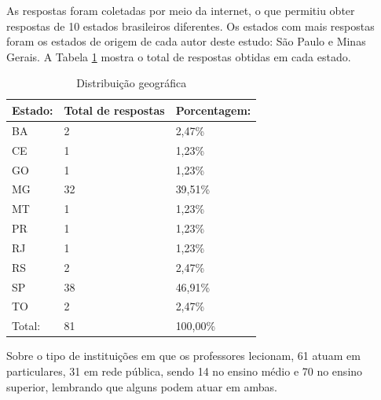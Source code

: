 As respostas foram coletadas por meio da internet, o que permitiu obter respostas de 10 estados brasileiros diferentes. Os estados com mais respostas foram os estados de origem de cada autor deste estudo: São Paulo e Minas Gerais.
A Tabela \ref{tab:distribuicao_geografica} mostra o total de respostas obtidas em cada estado.

\bgroup
\def\arraystretch{1.5} %
\begin{table}[h]{} %
\centering
\caption{Distribuição geográfica}
\begin{tabular}{ | p{3cm} | p{5cm}| p{5cm}| } \hline
\textbf{Estado:} & \textbf{Total de respostas} & \textbf{Porcentagem: } \\ \hline
BA & 2 & 2,47\% \\ \hline
CE & 1 & 1,23\% \\ \hline
GO & 1 & 1,23\% \\ \hline
MG & 32 & 39,51\% \\ \hline
MT & 1 & 1,23\% \\ \hline
PR & 1 & 1,23\% \\ \hline
RJ & 1 & 1,23\% \\ \hline
RS & 2 & 2,47\% \\ \hline
SP & 38 & 46,91\% \\ \hline
TO & 2 & 2,47\% \\ \hline
Total: & 81 & 100,00\% \\ \hline
\end{tabular}
\label{tab:distribuicao_geografica}
\end{table}
\egroup


Sobre o tipo de instituições em que os professores lecionam, 61 atuam em particulares, 31 em rede pública, sendo 14 no ensino médio e 70 no ensino superior, lembrando que alguns podem atuar em ambas. 

